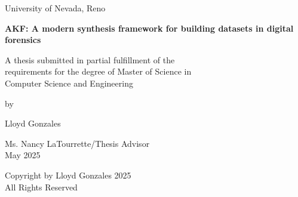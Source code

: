 \documentclass[letterpaper,12pt]{report}
\begin{document}

\newpage
\thispagestyle{empty}
\singlespacing

\begin{center}

\null

\vspace{1.5in}

University of Nevada, Reno \\

\vspace{1.5in}

\textbf{AKF: A modern synthesis framework for building datasets in digital forensics}

\vspace{1.5in}

A thesis submitted in partial fulfillment of the\\
requirements for the degree of Master of Science in\\
Computer Science and Engineering\\

\vspace{1in}

by

\vspace{0.25in}
Lloyd Gonzales
\vspace{0.5in}

Ms. Nancy LaTourrette/Thesis Advisor\\
May 2025\\

\end{center}


\newpage
\thispagestyle{empty}
\doublespacing

\begin{center}

\null

\vspace{4in}

Copyright by Lloyd Gonzales 2025\\
All Rights Reserved\\

\end{center}

\end{document}
